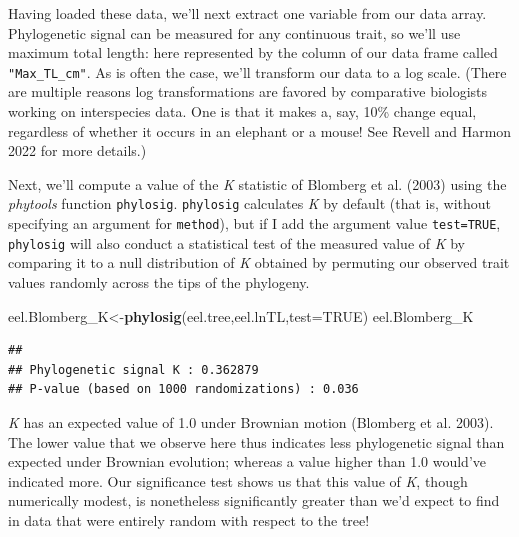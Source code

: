 \documentclass[fleqn,10pt,lineno]{wlpeerj} %
\newenvironment{Shaded}{\begin{snugshade}}{\end{snugshade}}
\newcommand{\AttributeTok}[1]{\textcolor[rgb]{0.13,0.29,0.53}{#1}}
\newcommand{\ConstantTok}[1]{\textcolor[rgb]{0.56,0.35,0.01}{#1}}
\newcommand{\FunctionTok}[1]{\textcolor[rgb]{0.13,0.29,0.53}{\textbf{#1}}}
\newcommand{\NormalTok}[1]{#1}
\newcommand{\OtherTok}[1]{\textcolor[rgb]{0.56,0.35,0.01}{#1}}
\newcommand{\SpecialCharTok}[1]{\textcolor[rgb]{0.81,0.36,0.00}{\textbf{#1}}}
\begin{document}
Having loaded these data, we'll next extract one variable from our data array. Phylogenetic signal can be measured for any continuous trait, so we'll use maximum total length: here represented by the column of our data frame called \texttt{"Max\_TL\_cm"}. As is often the case, we'll transform our data to a log scale. (There are multiple reasons log transformations are favored by comparative biologists working on interspecies data. One is that it makes a, say, 10\% change equal, regardless of whether it occurs in an elephant or a mouse! See Revell and Harmon 2022 for more details.)

\begin{Shaded}
\end{Shaded}

Next, we'll compute a value of the \emph{K} statistic of Blomberg et al. (2003) using the \emph{phytools} function \texttt{phylosig}. \texttt{phylosig} calculates \emph{K} by default (that is, without specifying an argument for \texttt{method}), but if I add the argument value \texttt{test=TRUE}, \texttt{phylosig} will also conduct a statistical test of the measured value of \emph{K} by comparing it to a null distribution of \emph{K} obtained by permuting our observed trait values randomly across the tips of the phylogeny.

\begin{Shaded}
\begin{Highlighting}[]
\NormalTok{eel.Blomberg\_K}\OtherTok{\textless{}{-}}\FunctionTok{phylosig}\NormalTok{(eel.tree,eel.lnTL,}\AttributeTok{test=}\ConstantTok{TRUE}\NormalTok{)}
\NormalTok{eel.Blomberg\_K}
\end{Highlighting}
\end{Shaded}

\begin{verbatim}
## 
## Phylogenetic signal K : 0.362879 
## P-value (based on 1000 randomizations) : 0.036
\end{verbatim}

\emph{K} has an expected value of 1.0 under Brownian motion (Blomberg et al. 2003). The lower value that we observe here thus indicates less phylogenetic signal than expected under Brownian evolution; whereas a value higher than 1.0 would've indicated more. Our significance test shows us that this value of \emph{K}, though numerically modest, is nonetheless significantly greater than we'd expect to find in data that were entirely random with respect to the tree!
\end{document}
